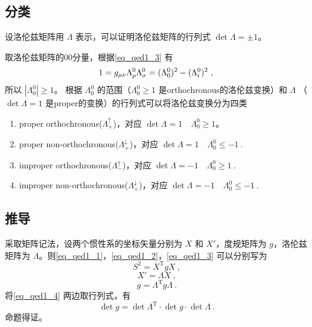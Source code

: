 \subsection{分类}
设洛伦兹矩阵用 $\Lambda$ 表示，可以证明洛伦兹矩阵的行列式 $\det \Lambda=\pm1$。

取洛伦兹矩阵的00分量，根据\autoref{eq_qed1_3} 有
\begin{equation}
1=g_{\mu \nu} \Lambda_{\rho}^{0} \Lambda_{\sigma}^{0}= (\Lambda_{0}^{0})^2- (\Lambda_{i}^{0})^2~,\\
\end{equation}
所以 $\left|\Lambda_{0}^{0} \right|\geqslant1$。 根据 $\Lambda_{0}^{0}$ 的范围（$\Lambda_{0}^{0}\geqslant1$ 是orthochronous的洛伦兹变换）和 $\Lambda$ （$\det\Lambda=1$ 是proper的变换）的行列式可以将洛伦兹变换分为四类
\begin{enumerate}
\item proper orthochronous($\Lambda_{+}^{\uparrow}$)，对应 $\det\Lambda=1\quad \Lambda_{0}^{0}\geqslant1$。
\item proper non-orthochronous($\Lambda_{+}^{\downarrow}$)，对应 $\det\Lambda=1\quad \Lambda_{0}^{0}\leqslant-1~.$
\item improper orthochronous($\Lambda_{-}^{\uparrow}$)，对应 $\det\Lambda=-1 \quad\Lambda_{0}^{0}\geqslant1~.$
\item improper non-orthochronous($\Lambda_{+}^{\downarrow}$)，对应 $\det\Lambda=-1 \quad\Lambda_{0}^{0}\leqslant-1~.$
\end{enumerate}

\subsection{推导}
采取矩阵记法，设两个惯性系的坐标矢量分别为 $X$ 和 $X'$，度规矩阵为 $g$，洛伦兹矩阵为 $\Lambda$。则\autoref{eq_qed1_1}，\autoref{eq_qed1_2}，\autoref{eq_qed1_3} 可以分别写为
\begin{equation}
S^{2}=X^{\mathrm{T}} g X~,
\end{equation}
\begin{equation}
X'=\Lambda X~,
\end{equation}
\begin{equation}\label{eq_qed1_4}
g=\Lambda^{\mathrm{T}} g \Lambda~.
\end{equation}
将\autoref{eq_qed1_4} 两边取行列式，有
\begin{equation}
\det g=\det\Lambda^{\mathrm{T}}\cdot \det g\cdot \det\Lambda~.
\end{equation}
命题得证。
